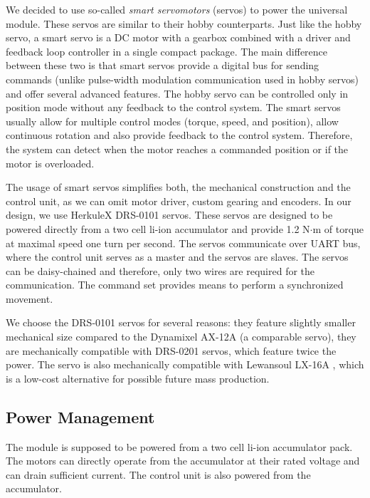 We decided to use so-called \emph{smart servomotors} (servos) to power the
universal module. These servos are similar to their hobby counterparts. Just
like the hobby servo, a smart servo is a DC motor with a gearbox combined with a
driver and feedback loop controller in a single compact package. The main
difference between these two is that smart servos provide a digital bus for
sending commands (unlike pulse-width modulation communication used in hobby
servos) and offer several advanced features. The hobby servo can be controlled
only in position mode without any feedback to the control system. The smart
servos usually allow for multiple control modes (torque, speed, and position),
allow continuous rotation and also provide feedback to the control system.
Therefore, the system can detect when the motor reaches a commanded
position or if the motor is overloaded.

The usage of smart servos simplifies both, the mechanical construction and the
control unit, as we can omit motor driver, custom gearing and encoders. In our
design, we use HerkuleX DRS-0101 \cite{noauthor_herkulex_nodate} servos. These
servos are designed to be powered directly from a two cell li-ion accumulator
and provide 1.2 N$\cdot$m of torque at maximal speed one turn per second. The
servos communicate over UART bus, where the control unit serves as a master and
the servos are slaves. The servos can be daisy-chained and therefore, only two
wires are required for the communication. The command set provides means to
perform a synchronized movement.

We choose the DRS-0101 servos for several reasons: they feature slightly smaller
mechanical size compared to the Dynamixel AX-12A \cite{noauthor_dynamixel_2006}
(a comparable servo), they are mechanically compatible with DRS-0201
\cite{noauthor_herkulex_nodate} servos, which feature twice the power. The servo
is also mechanically compatible with Lewansoul LX-16A
\cite{noauthor_lx-16a_2018}, which is a low-cost alternative for possible future
mass production.

\subsection{Power Management}

The module is supposed to be powered from a two cell li-ion accumulator pack.
The motors can directly operate from the accumulator at their rated voltage and
can drain sufficient current. The control unit is also powered from the
accumulator.

